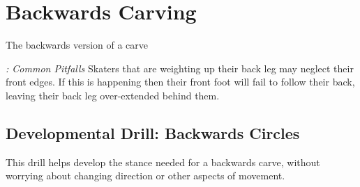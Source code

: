 
\section{Backwards Carving}

\label{sec:sticky/backwards_carves}

The backwards version of a carve


{\it: Common Pitfalls}
Skaters that are weighting up their back leg may neglect their front edges. If this is happening then their front foot will fail to follow their back, leaving their back leg over-extended behind them.   



\subsection*{Developmental Drill: Backwards Circles}

This drill helps develop the stance needed for a backwards carve, without worrying about changing direction or other aspects of movement.  
